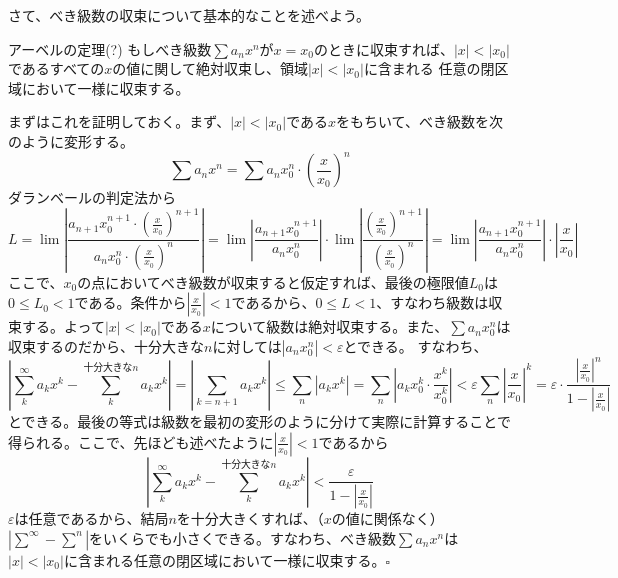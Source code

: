 \documentclass[a4j,dvipdfmx]{jsarticle}
\begin{document}
                さて、べき級数の収束について基本的なことを述べよう。
                \begin{itembox}{アーベルの定理(?)}
                    もしべき級数$\sum a_nx^n$が$x=x_0$のときに収束すれば、$|x|<|x_0|$であるすべての$x$の値に関して絶対収束し、領域$|x|<|x_0|$に含まれる
                    任意の閉区域において一様に収束する。
                \end{itembox}
                まずはこれを証明しておく。まず、$|x|<|x_0|$である$x$をもちいて、べき級数を次のように変形する。
                \begin{equation*}
                    \sum a_nx^n = \sum a_n x_0^n\cdot\left(\frac{x}{x_0}\right)^n
                \end{equation*}
                ダランベールの判定法から
                \begin{equation*}
                    L=\lim \left|\frac{a_{n+1}x_0^{n+1}\cdot \left(\frac{x}{x_0}\right)^{n+1}}{a_{n}x_0^{n}\cdot\left(\frac{x}{x_0}\right)^{n}}\right|=\lim\left|\frac{a_{n+1}x_0^{n+1}}{a_{n}x_0^{n}}\right|\cdot \lim\left|\frac{\left(\frac{x}{x_0}\right)^{n+1}}{ \left(\frac{x}{x_0}\right)^{n}}\right|=\lim\left|\frac{a_{n+1}x_0^{n+1}}{a_{n}x_0^{n}}\right|\cdot \left|\frac{x}{x_0}\right|
                \end{equation*}
                ここで、$x_0$の点においてべき級数が収束すると仮定すれば、最後の極限値$L_0$は$0\leq L_0<1$である。条件から$\left|\frac{x}{x_0}\right|<1$であるから、$0\leq L<1$、すなわち級数は収束する。よって$|x|<|x_0|$である$x$について級数は絶対収束する。また、$\sum a_nx_0^n$は収束するのだから、十分大きな$n$に対しては$|a_nx_0^n| < \varepsilon$とできる。
                すなわち、
                \begin{equation*}
                    \left|\sum_{k}^\infty a_kx^k - \sum_k^{\text{十分大きな}n}a_kx^k\right|=\left|\sum_{k=n+1}a_kx^{k}\right|\leq \sum_{n}|a_kx^k|=\sum_{n}|a_kx_0^k\cdot \frac{x^k}{x_0^k}|<\varepsilon\sum_{n}\left|\frac{x}{x_0}\right|^k=\varepsilon\cdot \frac{\left|\frac{x}{x_0}\right|^n}{1-\left|\frac{x}{x_0}\right|}
                \end{equation*}
                とできる。最後の等式は級数を最初の変形のように分けて実際に計算することで得られる。ここで、先ほども述べたように$\left|\frac{x}{x_0}\right|<1$であるから
                \begin{equation*}
                    \left|\sum_{k}^\infty a_kx^k - \sum_k^{\text{十分大きな}n}a_kx^k\right|<\frac{\varepsilon}{1-\left|\frac{x}{x_0}\right|}
                \end{equation*}
                $\varepsilon$は任意であるから、結局$n$を十分大きくすれば、（$x$の値に関係なく）$|\sum^{\infty}-\sum^{n}|$をいくらでも小さくできる。すなわち、べき級数$\sum a_nx^n$は$|x|<|x_0|$に含まれる任意の閉区域において一様に収束する。$\square$
\end{document}

